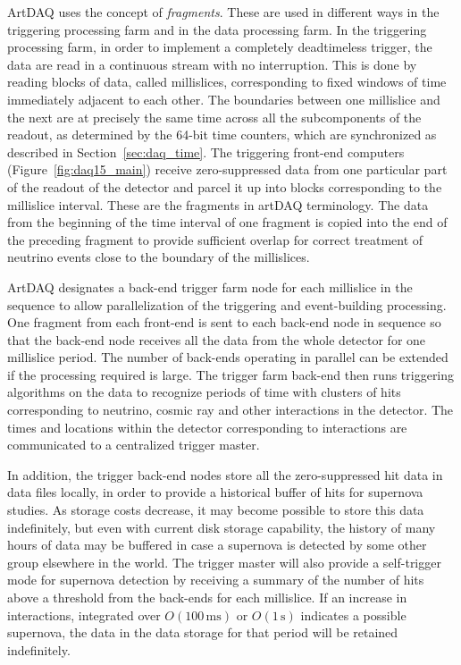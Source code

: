 ArtDAQ uses the concept of {\it fragments}. These are used
in different ways in the triggering processing farm and in the data
processing farm.  In the triggering processing farm, in order to
implement a completely deadtimeless trigger, the data are read in a
continuous stream with no interruption.  This is done by reading
blocks of data, called millislices, corresponding to fixed windows of
time %
immediately adjacent to each other.  The boundaries
between one millislice and the next are at precisely the same time
across all the subcomponents of the readout, as determined by the
64-bit time counters, which are synchronized as described in
Section~\ref{sec:daq_time}.  The triggering front-end computers
(Figure~\ref{fig:daq15_main}) receive zero-suppressed data from one
particular part of the readout of the detector and parcel it up into
blocks corresponding to the millislice interval.  These are the
fragments in artDAQ terminology.  The data from the beginning of the
time interval of one fragment is copied into the end of the preceding
fragment to provide sufficient overlap for correct treatment of
neutrino events close to the boundary of the millislices.

ArtDAQ designates a back-end trigger farm node for each millislice in
the sequence to allow parallelization of the triggering and event-building
processing.  One fragment from each front-end is sent to each back-end
node in sequence so that the back-end node receives all the data from
the whole detector for one millislice period.  The number of back-ends
operating in parallel can be extended if the processing required is
large. The trigger farm back-end then runs triggering algorithms on the
data to recognize periods of time with clusters of hits corresponding
to neutrino, cosmic ray and other interactions in the detector.  The
times and locations within the detector corresponding to interactions
are communicated to a centralized trigger master.  

In addition, the trigger back-end nodes store all the zero-suppressed
hit data in data files locally, in order to provide a historical
buffer of hits for supernova studies.  As storage costs decrease, it
may become possible to store this data indefinitely, but even with
current disk storage capability, the history of many hours of data may
be buffered in case a supernova is detected by some other group elsewhere
in the world.  The trigger master will also provide a self-trigger mode
for supernova detection by receiving a summary of the number of hits
above a threshold from the back-ends for each millislice.  If an
increase in interactions, integrated over $O(100\,\mathrm{ms})$ or
$O(1\,\mathrm{s})$ indicates a possible supernova, the data in the
data storage for that period will be retained indefinitely.

